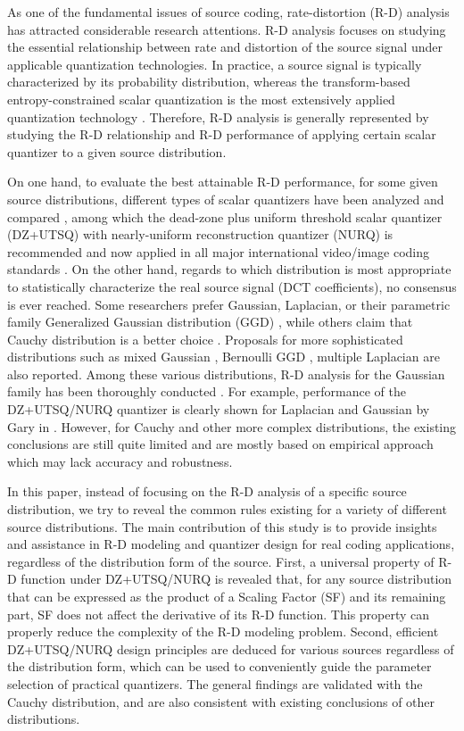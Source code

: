 \documentclass[smallabstract,smallcaptions]{dccpaper}
\begin{document}
As one of the fundamental issues of source coding, rate-distortion (R-D) analysis has attracted considerable research attentions. R-D analysis focuses on studying the essential relationship between rate and distortion of the source signal under applicable quantization technologies. In practice, a source signal is typically characterized by its probability distribution, whereas the transform-based entropy-constrained scalar quantization is the most extensively applied quantization technology \cite{Hang_TCSVT1997}. Therefore, R-D analysis is generally represented by studying the R-D relationship and R-D performance of applying certain scalar quantizer to a given source distribution.

On one hand, to evaluate the best attainable R-D performance, for some given source distributions, different types of scalar quantizers have been analyzed and compared \cite{Sullivan_TIT1996}, among which the dead-zone plus uniform threshold scalar quantizer (DZ+UTSQ) with nearly-uniform reconstruction quantizer (NURQ) is recommended and now applied in all major international video/image coding standards \cite{Sullivan_VCIP2005}. On the other hand, regards to which distribution is most appropriate to statistically characterize the real source signal (DCT coefficients), no consensus is ever reached. Some researchers prefer Gaussian, Laplacian, or their parametric family Generalized Gaussian distribution (GGD) \cite{Pratt_Wiley1978,Smooth_SPIE1996,Sun_TCSVT2009}, while others claim that Cauchy distribution is a better choice \cite{Kamaci_TCSVT2005} \cite{Rod_TCSVT2010}. Proposals for more sophisticated distributions such as mixed Gaussian \cite{Eude_ICASSP1994}, Bernoulli GGD \cite{Fraysse_TIT2009}, multiple Laplacian \cite{Lee_TCSVT2014} are also reported. Among these various distributions, R-D analysis for the Gaussian family has been thoroughly conducted \cite{Sun_TIP2013}. For example, performance of the DZ+UTSQ/NURQ quantizer is clearly shown for Laplacian and Gaussian by Gary in \cite{Sullivan_VCIP2005}. However, for Cauchy and other more complex distributions, the existing conclusions are still quite limited and are mostly based on empirical approach which may lack accuracy and robustness.

In this paper, instead of focusing on the R-D analysis of a specific source distribution, we try to reveal the common rules existing for a variety of different source distributions. The main contribution of this study is to provide insights and assistance in R-D modeling and quantizer design for real coding applications, regardless of the distribution form of the source. First, a universal property of R-D function under DZ+UTSQ/NURQ is revealed that, for any source distribution that can be expressed as the product of a Scaling Factor (SF) and its remaining part, SF does not affect the derivative of its R-D function. This property can properly reduce the complexity of the R-D modeling problem. Second, efficient DZ+UTSQ/NURQ design principles are deduced for various sources regardless of the distribution form, which can be used to conveniently guide the parameter selection of practical quantizers. The general findings are validated with the Cauchy distribution, and are also consistent with existing conclusions of other distributions.
\end{document}
